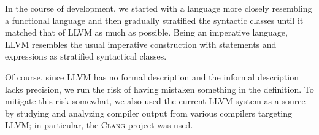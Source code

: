 \documentclass[a4paper, oneside, 10pt, draft]{memoir}
\newcommand{\clang}{\textsc{Clang}}
\begin{document}
In the course of development, we started with a language more closely
resembling a functional language and then gradually stratified the
syntactic classes until it matched that of LLVM as much as
possible. Being an imperative language, LLVM resembles the usual
imperative construction with statements and expressions as stratified
syntactical classes.

Of course, since LLVM has no formal description and the informal
description lacks precision\cite{lattner.ea:2009:llvm-ref}, we run the
risk of having mistaken something in the definition. To mitigate this
risk somewhat, we also used the current LLVM system as a source by
studying and analyzing compiler output from various compilers
targeting LLVM; in particular, the \clang{}-project was used.

\newcommand{\registers}{\mathrm{Registers}}
\newcommand{\constants}{\mathrm{Constants}}
\newcommand{\operations}{\mathrm{Operations}}
\newcommand{\instructions}{\mathrm{Instructions}}
\newcommand{\programs}{\mathrm{Programs}}
\newcommand{\definitions}{\mathrm{Definitions}}
\newcommand{\basicblocks}{\mathrm{Basic Blocks}}
\newcommand{\iret}[1]{\mathbf{ret} \; #1}
\end{document}
